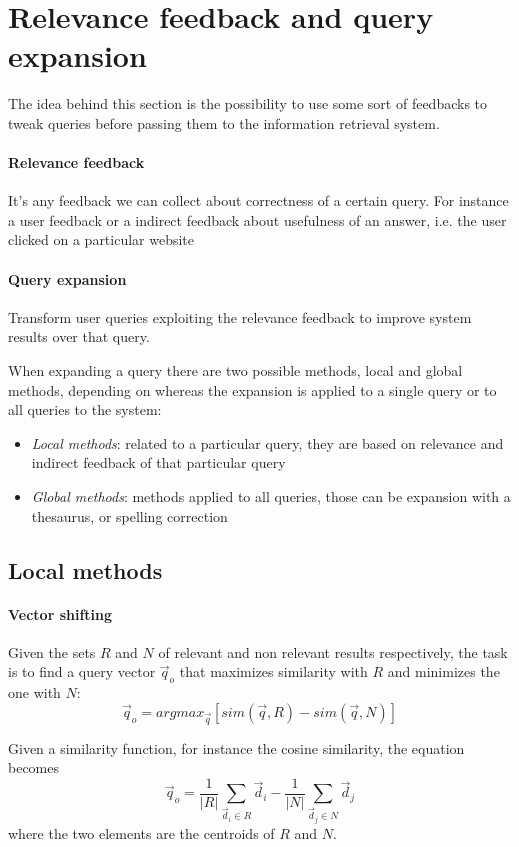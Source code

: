 \section{Relevance feedback and query expansion}
The idea behind this section is the possibility to 
use some sort of feedbacks to tweak queries before passing
them to the information retrieval system.

\paragraph{Relevance feedback}
It's any feedback we can collect about correctness 
of a certain query. For instance a user feedback or a indirect 
feedback about usefulness of an answer, i.e. the user clicked on a 
particular website

\paragraph{Query expansion}
Transform user queries exploiting the relevance feedback
to improve system results over that query.

When expanding a query there are two possible methods, 
local and global methods, depending on whereas the expansion
is applied to a single query or to all queries to the system:
\begin{itemize}
    \item \emph{Local methods}: related to a particular query, they are based 
    on relevance and indirect feedback of that particular query
    \item \emph{Global methods}: methods applied to all queries, those can be 
    expansion with a thesaurus, or spelling correction
\end{itemize}

\subsection{Local methods}
\paragraph{Vector shifting}
Given the sets $R$ and $N$ of relevant and non relevant results respectively, 
the task is to find a query vector $\vec{q}_o$ that maximizes similarity 
with $R$ and minimizes the one with $N$:
$$\vec{q}_o = \mathit{argmax}_{\vec{q}}[\mathit{sim}(\vec{q}, R) - \mathit{sim}(\vec{q}, N)]$$

Given a similarity function, for instance the cosine similarity, the equation becomes
$$\vec{q}_o = \frac{1}{|R|}\sum_{\vec{d}_i \in R}\vec{d}_i - \frac{1}{|N|}\sum_{\vec{d}_j \in N}\vec{d}_j$$
where the two elements are the centroids of $R$ and $N$.

